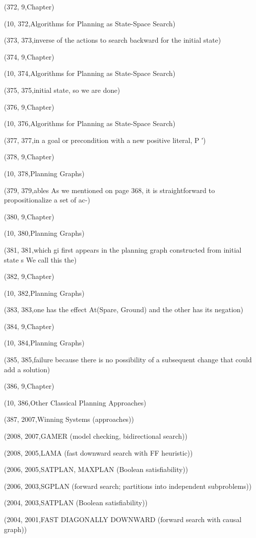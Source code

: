 (372, 9,Chapter)

(10, 372,Algorithms for Planning as State-Space Search)

(373, 373,inverse of the actions to search backward for the initial state)

(374, 9,Chapter)

(10, 374,Algorithms for Planning as State-Space Search)

(375, 375,initial state, so we are done)

(376, 9,Chapter)

(10, 376,Algorithms for Planning as State-Space Search)

(377, 377,in a goal or precondition with a new positive literal, P ′)

(378, 9,Chapter)

(10, 378,Planning Graphs)

(379, 379,ables As we mentioned on page 368, it is straightforward to propositionalize a set of ac-)

(380, 9,Chapter)

(10, 380,Planning Graphs)

(381, 381,which gi ﬁrst appears in the planning graph constructed from initial state s We call this the)

(382, 9,Chapter)

(10, 382,Planning Graphs)

(383, 383,one has the effect At(Spare, Ground) and the other has its negation)

(384, 9,Chapter)

(10, 384,Planning Graphs)

(385, 385,failure because there is no possibility of a subsequent change that could add a solution)

(386, 9,Chapter)

(10, 386,Other Classical Planning Approaches)

(387, 2007,Winning Systems (approaches))

(2008, 2007,GAMER (model checking, bidirectional search))

(2008, 2005,LAMA (fast downward search with FF heuristic))

(2006, 2005,SATPLAN, MAXPLAN (Boolean satisﬁability))

(2006, 2003,SGPLAN (forward search; partitions into independent subproblems))

(2004, 2003,SATPLAN (Boolean satisﬁability))

(2004, 2001,FAST DIAGONALLY DOWNWARD (forward search with causal graph))

